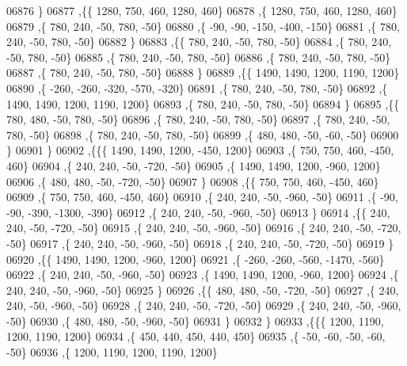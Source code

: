 \begin{DoxyCode}
06876     \}
06877    ,\{\{  1280,   750,   460,  1280,   460\}
06878     ,\{  1280,   750,   460,  1280,   460\}
06879     ,\{   780,   240,   -50,   780,   -50\}
06880     ,\{   -90,   -90,  -150,  -400,  -150\}
06881     ,\{   780,   240,   -50,   780,   -50\}
06882     \}
06883    ,\{\{   780,   240,   -50,   780,   -50\}
06884     ,\{   780,   240,   -50,   780,   -50\}
06885     ,\{   780,   240,   -50,   780,   -50\}
06886     ,\{   780,   240,   -50,   780,   -50\}
06887     ,\{   780,   240,   -50,   780,   -50\}
06888     \}
06889    ,\{\{  1490,  1490,  1200,  1190,  1200\}
06890     ,\{  -260,  -260,  -320,  -570,  -320\}
06891     ,\{   780,   240,   -50,   780,   -50\}
06892     ,\{  1490,  1490,  1200,  1190,  1200\}
06893     ,\{   780,   240,   -50,   780,   -50\}
06894     \}
06895    ,\{\{   780,   480,   -50,   780,   -50\}
06896     ,\{   780,   240,   -50,   780,   -50\}
06897     ,\{   780,   240,   -50,   780,   -50\}
06898     ,\{   780,   240,   -50,   780,   -50\}
06899     ,\{   480,   480,   -50,   -60,   -50\}
06900     \}
06901    \}
06902   ,\{\{\{  1490,  1490,  1200,  -450,  1200\}
06903     ,\{   750,   750,   460,  -450,   460\}
06904     ,\{   240,   240,   -50,  -720,   -50\}
06905     ,\{  1490,  1490,  1200,  -960,  1200\}
06906     ,\{   480,   480,   -50,  -720,   -50\}
06907     \}
06908    ,\{\{   750,   750,   460,  -450,   460\}
06909     ,\{   750,   750,   460,  -450,   460\}
06910     ,\{   240,   240,   -50,  -960,   -50\}
06911     ,\{   -90,   -90,  -390, -1300,  -390\}
06912     ,\{   240,   240,   -50,  -960,   -50\}
06913     \}
06914    ,\{\{   240,   240,   -50,  -720,   -50\}
06915     ,\{   240,   240,   -50,  -960,   -50\}
06916     ,\{   240,   240,   -50,  -720,   -50\}
06917     ,\{   240,   240,   -50,  -960,   -50\}
06918     ,\{   240,   240,   -50,  -720,   -50\}
06919     \}
06920    ,\{\{  1490,  1490,  1200,  -960,  1200\}
06921     ,\{  -260,  -260,  -560, -1470,  -560\}
06922     ,\{   240,   240,   -50,  -960,   -50\}
06923     ,\{  1490,  1490,  1200,  -960,  1200\}
06924     ,\{   240,   240,   -50,  -960,   -50\}
06925     \}
06926    ,\{\{   480,   480,   -50,  -720,   -50\}
06927     ,\{   240,   240,   -50,  -960,   -50\}
06928     ,\{   240,   240,   -50,  -720,   -50\}
06929     ,\{   240,   240,   -50,  -960,   -50\}
06930     ,\{   480,   480,   -50,  -960,   -50\}
06931     \}
06932    \}
06933   ,\{\{\{  1200,  1190,  1200,  1190,  1200\}
06934     ,\{   450,   440,   450,   440,   450\}
06935     ,\{   -50,   -60,   -50,   -60,   -50\}
06936     ,\{  1200,  1190,  1200,  1190,  1200\}

\end{DoxyCode}
